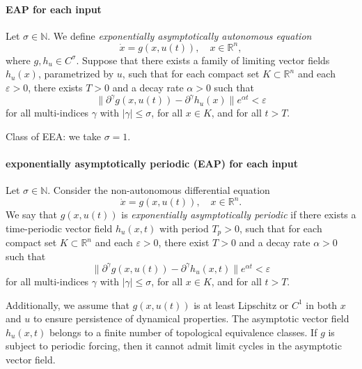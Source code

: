 \documentclass{article}
\newcounter{ct}
\begin{document}
\paragraph{EAP for each input}\label{sec:eea_input}
\begin{definition}\label{def:eaa_input}
Let \(\sigma \in \mathbb{N}\).
We define \emph{exponentially asymptotically autonomous equation  }
\[
\dot{x} = g(x,u(t)), \quad x \in \mathbb{R}^n,
\]
where \( g, h_u \in C^\sigma \). Suppose that there exists a family of limiting vector fields \( h_u(x) \), parametrized by \( u \), such that for each compact set \( K \subset \mathbb{R}^n \) and each \( \varepsilon > 0 \), there exists \( T > 0 \) and a decay rate \( \alpha > 0 \) such that  
\[
\|\partial^\gamma g(x, u(t)) - \partial^\gamma h_u(x)\| e^{\alpha t} < \varepsilon
\]
for all multi-indices \( \gamma \) with \( |\gamma| \leq \sigma \), for all \( x \in K \), and for all \( t > T \).
\end{definition}

Class of EEA: 
we take $\sigma =  1$.

\paragraph{exponentially asymptotically periodic (EAP) for each input}\label{sec:eea_input_periodic}
\begin{definition}\label{def:eaa_periodic}
Let \(\sigma \in \mathbb{N}\).
 Consider the non-autonomous differential equation  
\[
\dot{x} = g(x,u(t)), \quad x \in \mathbb{R}^n.
\]
We say that \( g(x, u(t)) \) is \emph{exponentially asymptotically periodic} if there exists a time-periodic vector field \( h_u(x,t) \) with period \( T_p > 0 \), such that for each compact set \( K \subset \mathbb{R}^n \) and each \( \varepsilon > 0 \), there exist \( T > 0 \) and a decay rate \( \alpha > 0 \) such that  
\[
\|\partial^\gamma g(x, u(t)) - \partial^\gamma h_u(x,t)\| e^{\alpha t} < \varepsilon
\]
for all multi-indices \( \gamma \) with \( |\gamma| \leq \sigma \), for all \( x \in K \), and for all \( t > T \).

Additionally, we assume that \( g(x, u(t)) \) is at least Lipschitz or \( C^1 \) in both \( x \) and \( u \) to ensure persistence of dynamical properties. The asymptotic vector field \( h_u(x,t) \) belongs to a finite number of topological equivalence classes. If \( g \) is subject to periodic forcing, then it cannot admit limit cycles in the asymptotic vector field.
\end{definition}
\end{document}
